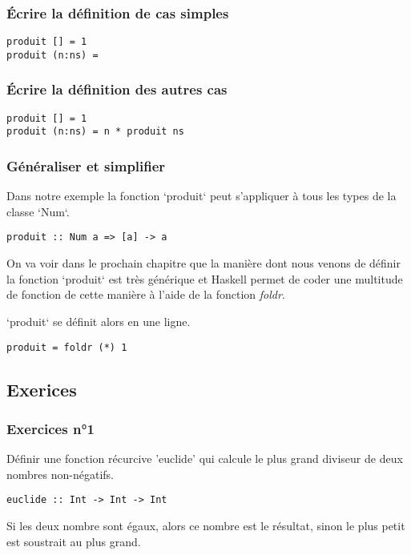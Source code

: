 \documentclass[11pt]{article}
\begin{document}
\subsubsection{Écrire la définition de cas simples}
\label{sec:org31969e9}
\begin{verbatim}
produit [] = 1
produit (n:ns) = 
\end{verbatim}

\subsubsection{Écrire la définition des autres cas}
\label{sec:orgf496aca}
\begin{verbatim}
produit [] = 1
produit (n:ns) = n * produit ns
\end{verbatim}

\subsubsection{Généraliser et simplifier}
\label{sec:org8ba95f1}
Dans notre exemple la fonction `produit` peut s'appliquer à tous les types de la classe `Num`.
\begin{verbatim}
produit :: Num a => [a] -> a
\end{verbatim}

On va voir dans le prochain chapitre que la manière dont nous venons de définir la fonction `produit`  est très générique et Haskell permet de coder une multitude de fonction de cette manière à l'aide de la fonction \emph{foldr}.   

`produit` se  définit alors en une ligne.
\begin{verbatim}
produit = foldr (*) 1
\end{verbatim}

\subsection{Exerices}
\label{sec:orge8137ad}

\subsubsection{Exercices n°1}
\label{sec:orgea4d1db}
Définir une fonction récurcive 'euclide' qui calcule le plus grand diviseur de deux nombres non-négatifs.  
\begin{verbatim}
euclide :: Int -> Int -> Int
\end{verbatim}
Si les deux nombre sont égaux, alors ce nombre est le résultat, sinon le plus petit est soustrait au plus grand.
\end{document}
